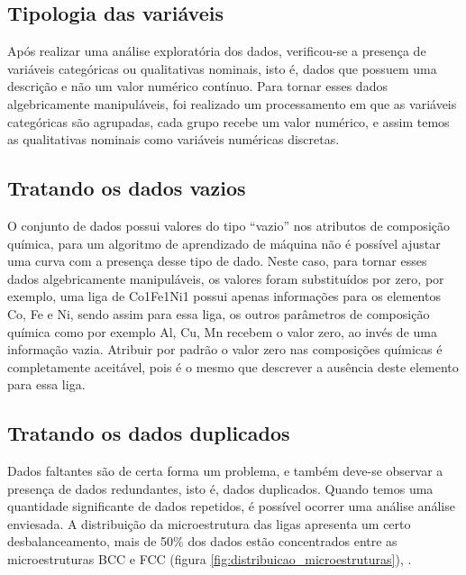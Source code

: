 \subsection{Tipologia das variáveis}\label{sec:MAT_MET_SEC_B_SUB_A}

Após realizar uma análise exploratória dos dados, verificou-se a presença de variáveis categóricas ou qualitativas nominais, isto é, dados que possuem uma descrição e não um valor numérico contínuo\cite{pinheiro2013probabilidade}. Para tornar esses dados algebricamente manipuláveis, foi realizado um processamento em que as variáveis categóricas são agrupadas, cada grupo recebe um valor numérico, e assim temos as qualitativas nominais como variáveis numéricas discretas\cite{pinheiro2013probabilidade}. 

\subsection{Tratando os dados vazios}\label{sec:MAT_MET_SEC_B_SUB_B}

O conjunto de dados possui valores do tipo ``vazio'' nos atributos de composição química, para um algoritmo de aprendizado de máquina não é possível ajustar uma curva com a presença desse tipo de dado. Neste caso, para tornar esses dados algebricamente manipuláveis, os valores foram substituídos por zero, por exemplo, uma liga de Co1Fe1Ni1 possui apenas informações para os elementos Co, Fe e Ni, sendo assim para essa liga, os outros parâmetros de composição química como por exemplo Al, Cu, Mn recebem o valor zero, ao invés de uma informação vazia. Atribuir por padrão o valor zero nas composições químicas é completamente aceitável, pois é o mesmo que descrever a ausência deste elemento para essa liga.





\subsection{Tratando os dados duplicados}\label{sec:MAT_MET_SEC_B_SUB_C}
Dados faltantes são de certa forma um problema, e também deve-se observar a presença de dados redundantes, isto é, dados duplicados. Quando temos uma quantidade significante de dados repetidos, é possível ocorrer uma análise análise enviesada. A distribuição da microestrutura das ligas apresenta um certo desbalanceamento, mais de 50\% dos dados estão concentrados entre as microestruturas BCC e FCC (figura \ref{fig:distribuicao_microestruturas}), .

